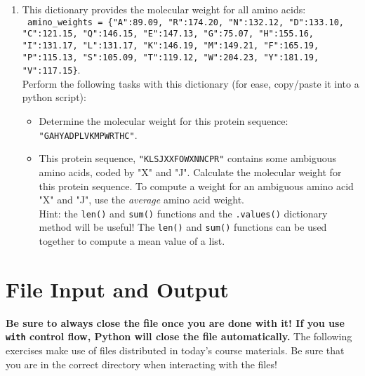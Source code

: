 \documentclass{article}[12pt]
\newcommand{\code}[1]{\texttt{#1}}  %
\begin{document}
\begin{enumerate}
	\item This dictionary provides the molecular weight for all amino acids: \\ \code{ amino\_weights = \{"A":89.09, "R":174.20, "N":132.12, "D":133.10, "C":121.15, "Q":146.15, "E":147.13, "G":75.07, "H":155.16, "I":131.17, "L":131.17, "K":146.19, "M":149.21, "F":165.19, "P":115.13, "S":105.09, "T":119.12, "W":204.23, "Y":181.19, "V":117.15\}}. \\ Perform the following tasks with this dictionary (for ease, copy/paste it into a python script):
	\begin{itemize}
		\item Determine the molecular weight for this protein sequence: \\ \code{"GAHYADPLVKMPWRTHC"}.
		\item This protein sequence, \code{"KLSJXXFOWXNNCPR"} contains some ambiguous amino acids, coded by "X" and "J". Calculate the molecular weight for this protein sequence. To compute a weight for an ambiguous amino acid "X" and "J", use the \emph{average} amino acid weight. \\ Hint: the \code{len()} and \code{sum()} functions and the \code{.values()} dictionary method will be useful! The \code{len()} and \code{sum()} functions can be used together to compute a mean value of a list.
		
	\end{itemize}
	
\end{enumerate}

\section{File Input and Output}

\textbf{Be sure to always close the file once you are done with it! If you use \code{with} control flow, Python will close the file automatically.}
The following exercises make use of files distributed in today's course materials. Be sure that you are in the correct directory when interacting with the files!
\end{document}
